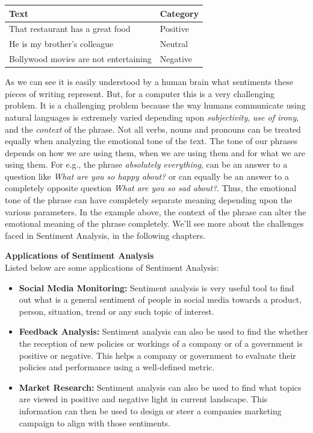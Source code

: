 \documentclass[a4paper, 12pt]{article}
\begin{document}
\begin{sloppypar}
\begin{table}[H]
\begin{tabularx}{\columnwidth}{| X | X |}
\hline
Text & Category \\ [0.5ex]
\hline
\hline
That restaurant has a great food & Positive \\ [0.5ex]
\hline
He is my brother's colleague & Neutral \\ [0.5ex]
\hline
Bollywood movies are not entertaining & Negative \\ [0.5ex]
\hline
\end{tabularx}
\end{table}

As we can see it is easily understood by a human brain what sentiments these pieces of writing represent. But, for a computer this is a very challenging problem. It is a challenging problem because the way humans communicate using natural languages is extremely varied depending  upon \textit{subjectivity}, \textit{use of irony}, and the \textit{context} of the phrase. Not all verbs, nouns and pronouns can be treated equally when analyzing the emotional tone of the text. The tone of our phrases depends on how we are using them, when we are using them and for what we are using them. For e.g., the phrase \textit{absolutely everything}, can be an answer to a question like \textit{What are you so happy about?} or can equally be an answer to a completely opposite  question \textit{What are you so sad about?}. Thus, the emotional tone of the phrase can have completely separate meaning depending upon the various parameters. In the example above, the context of the phrase can alter the emotional meaning of the phrase completely. We'll see more about the challenges faced in Sentiment Analysis, in the following chapters.

\large \textbf{Applications of Sentiment Analysis} \\[0.5ex]
\normalsize
Listed below are some applications of Sentiment Analysis:
\begin{itemize}
\item{
\textbf{Social Media Monitoring: } Sentiment analysis is very useful tool to find out what is a general sentiment of people in social media towards a product, person, situation, trend or any such topic of interest.}
\item{
\textbf{Feedback Analysis: } Sentiment analysis can also be used to find the whether the  reception of new policies or workings of a company or of a government is positive or negative. This helps a company or government to evaluate their policies and performance using a well-defined metric.}
\item{
\textbf{Market Research: } Sentiment analysis can also be used to find what topics are viewed in positive and negative light in current landscape. This information can then be used to design or steer a companies marketing campaign to align with those sentiments.}
\end{itemize}



\end{sloppypar}
\end{document}
